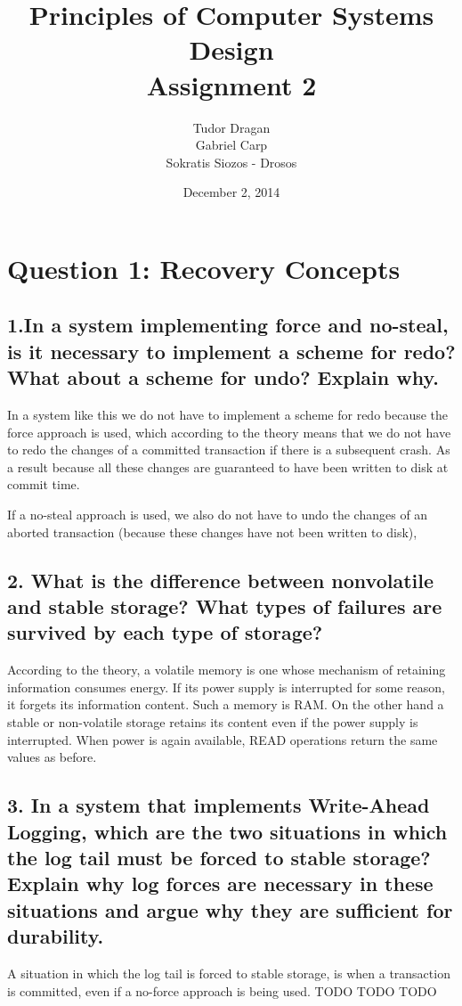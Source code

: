 \documentclass{article}      %
\title{\bf Principles of Computer Systems Design\\ {\Large Assignment 2}}  %
\author{Tudor Dragan\\
Gabriel Carp\\
Sokratis Siozos - Drosos}      %
\date{December 2, 2014}      %
\begin{document}

\maketitle                   %

\section*{Question 1: Recovery Concepts} 


\subsection*{1.In a system implementing force and no-steal, is it necessary to implement a scheme for redo? What about a scheme for undo? Explain why.}
In a system like this we do not have to implement a scheme for redo because the force approach is used, which according to the theory means that we do not have to redo the changes of a committed transaction if there is a subsequent crash. As a result because all these changes are guaranteed to have been written to disk at commit time.  

If a no-steal approach is used,
we also do not have to undo the changes of an aborted transaction (because these changes have not been written to disk),


\subsection*{2.  What is the difference between nonvolatile and stable storage? What types of failures are survived by each type of storage?}

According to the theory, a volatile memory is one whose mechanism of retaining information consumes energy. If its power supply is interrupted for some reason, it forgets its information content. Such a memory is RAM. On the other hand a stable or non-volatile storage retains its content even if the power supply is interrupted. When power is again available, READ operations return the same values as before.

\subsection*{3.  In a system that implements Write-Ahead Logging, which are the two situations in which the log tail must be forced to stable storage? Explain why log forces are necessary in these situations and argue why they are sufficient for durability.}
A situation in which the log tail is forced to stable storage, is when a transaction is committed, even if a no-force approach is being used.
TODO TODO TODO
\end{document}
